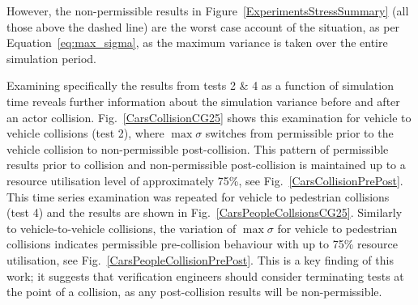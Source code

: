 \documentclass[letterpaper, 10 pt, journal, twoside]{IEEEtran}
\begin{document}




However, the non-permissible results in Figure~\ref{ExperimentsStressSummary} (all those above the dashed line) are the worst case account of the situation, as per Equation~\ref{eq:max_sigma}, as the maximum variance is taken over the entire simulation period.

Examining specifically the results from tests 2 \& 4 as a function of simulation time reveals further information about the simulation variance before and after an actor collision. Fig.~\ref{CarsCollisionCG25} shows this examination for vehicle to vehicle collisions (test 2), where $\max\sigma$ switches from permissible prior to the vehicle collision to non-permissible post-collision. 
%
This pattern of permissible results prior to collision and non-permissible post-collision is maintained up to a resource utilisation level of approximately 75\%, see Fig.~\ref{CarsCollisionPrePost}. This time series examination was repeated for vehicle to pedestrian collisions (test 4) and the results are shown in Fig.~\ref{CarsPeopleCollsionsCG25}. Similarly to vehicle-to-vehicle collisions, the variation of $\max\sigma$ for vehicle to pedestrian collisions indicates permissible pre-collision behaviour with up to 75\% resource utilisation, see Fig.~\ref{CarsPeopleCollisionPrePost}. This is a key finding of this work; it suggests that verification engineers should consider terminating tests at the point of a collision, as any post-collision results will be non-permissible.
\end{document}
